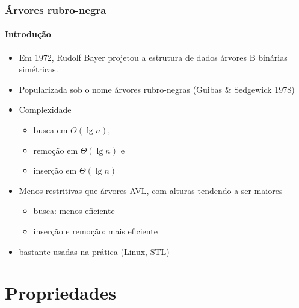 \documentclass{beamer}
\begin{document}
\begin{frame}

  \frametitle{Árvores rubro-negra}
  \framesubtitle{Introdução}

  
  \begin{itemize}
    
  \item Em 1972, Rudolf Bayer projetou a estrutura de dados árvores B binárias
    simétricas.

  \item Popularizada sob o nome árvores rubro-negras (Guibas \& Sedgewick 1978)

  \item Complexidade
    \begin{itemize}
    \item busca em $O(\lg n)$, 
    \item remoção em $\Theta(\lg n)$ e
    \item inserção em $\Theta(\lg n)$
    \end{itemize}

  \item Menos restritivas que árvores AVL, com alturas tendendo a ser maiores

    \begin{itemize}

      \item busca: menos eficiente

      \item inserção e remoção: mais eficiente

    \end{itemize}

  \item bastante usadas na prática (Linux, STL)

  \end{itemize}

\end{frame}

\section{Propriedades}
\end{document}
